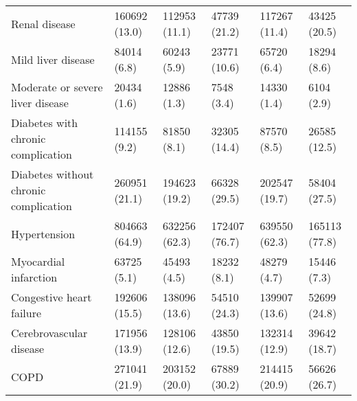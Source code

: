 \begin{adjustbox}{width={\textwidth},totalheight={\textheight},keepaspectratio,frame}
{\begin{tabular}{L{20em}C{10em}C{10em}C{10em}C{10em}C{10em}}
\hspace{3mm}              Renal disease &      160692 (13.0) &                 112953 (11.1) &              47739 (21.2) &                  117267 (11.4) &              43425 (20.5) \\
\hspace{3mm}         Mild liver disease &        84014 (6.8) &                   60243 (5.9) &              23771 (10.6) &                    65720 (6.4) &               18294 (8.6) \\
\hspace{3mm}       Moderate or severe liver disease &        20434 (1.6) &                   12886 (1.3) &                7548 (3.4) &                    14330 (1.4) &                6104 (2.9) \\
\hspace{3mm}     Diabetes with chronic complication &       114155 (9.2) &                   81850 (8.1) &              32305 (14.4) &                    87570 (8.5) &              26585 (12.5) \\
\hspace{3mm}  Diabetes without chronic complication &      260951 (21.1) &                 194623 (19.2) &              66328 (29.5) &                  202547 (19.7) &              58404 (27.5) \\
\hspace{3mm}                           Hypertension &      804663 (64.9) &                 632256 (62.3) &             172407 (76.7) &                  639550 (62.3) &             165113 (77.8) \\
\hspace{3mm}                  Myocardial infarction &        63725 (5.1) &                   45493 (4.5) &               18232 (8.1) &                    48279 (4.7) &               15446 (7.3) \\
\hspace{3mm}               Congestive heart failure &      192606 (15.5) &                 138096 (13.6) &              54510 (24.3) &                  139907 (13.6) &              52699 (24.8) \\
\hspace{3mm}                Cerebrovascular disease &      171956 (13.9) &                 128106 (12.6) &              43850 (19.5) &                  132314 (12.9) &              39642 (18.7) \\
\hspace{3mm}                                   COPD &      271041 (21.9) &                 203152 (20.0) &              67889 (30.2) &                  214415 (20.9) &              56626 (26.7) \\

\end{tabular}}
\end{adjustbox}
